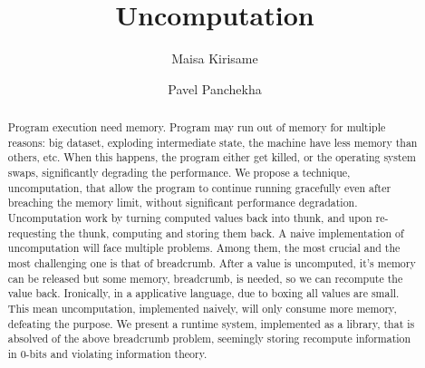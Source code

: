 \documentclass[acmsmall]{acmart}
\begin{document}
	\title{Uncomputation}
	\author{Maisa Kirisame}
	\authornotemark[1]

	\author{Pavel Panchekha}
	\email{}
	\authornotemark[1]
	
	\renewcommand{\shortauthors}{Kirisame et al.}
	\begin{abstract}
		Program execution need memory. Program may run out of memory for multiple reasons: big dataset, exploding intermediate state, the machine have less memory than others, etc. When this happens, the program either get killed, or the operating system swaps, significantly degrading the performance.
		We propose a technique, uncomputation, that allow the program to continue running gracefully even after breaching the memory limit, without significant performance degradation.
		Uncomputation work by turning computed values back into thunk, and upon re-requesting the thunk, computing and storing them back.
		A naive implementation of uncomputation will face multiple problems. Among them, the most crucial and the most challenging one is that of breadcrumb. After a value is uncomputed, it's memory can be released but some memory, breadcrumb, is needed, so we can recompute the value back.
		Ironically, in a applicative language, due to boxing all values are small. This mean uncomputation, implemented naively, will only consume more memory, defeating the purpose.
		We present a runtime system, implemented as a library, that is absolved of the above breadcrumb problem, seemingly storing recompute information in 0-bits and violating information theory.
	\end{abstract}
	
\end{document}
